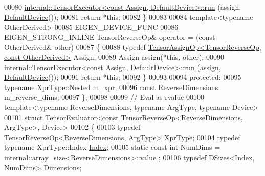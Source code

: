 \begin{DoxyCode}
00080       \hyperlink{class_eigen_1_1internal_1_1_tensor_executor}{internal::TensorExecutor<const Assign, DefaultDevice>::run}
      (assign, \hyperlink{struct_eigen_1_1_default_device}{DefaultDevice}());
00081       \textcolor{keywordflow}{return} *\textcolor{keyword}{this};
00082     \}
00083 
00084     \textcolor{keyword}{template}<\textcolor{keyword}{typename} OtherDerived>
00085     EIGEN\_DEVICE\_FUNC
00086     EIGEN\_STRONG\_INLINE TensorReverseOp& operator = (\textcolor{keyword}{const} OtherDerived& other)
00087     \{
00088       \textcolor{keyword}{typedef} \hyperlink{class_eigen_1_1_tensor_assign_op}{TensorAssignOp<TensorReverseOp, const OtherDerived>}
       Assign;
00089       Assign assign(*\textcolor{keyword}{this}, other);
00090       \hyperlink{class_eigen_1_1internal_1_1_tensor_executor}{internal::TensorExecutor<const Assign, DefaultDevice>::run}
      (assign, \hyperlink{struct_eigen_1_1_default_device}{DefaultDevice}());
00091       \textcolor{keywordflow}{return} *\textcolor{keyword}{this};
00092     \}
00093 
00094   \textcolor{keyword}{protected}:
00095     \textcolor{keyword}{typename} XprType::Nested m\_xpr;
00096     \textcolor{keyword}{const} ReverseDimensions m\_reverse\_dims;
00097 \};
00098 
00099 \textcolor{comment}{// Eval as rvalue}
00100 \textcolor{keyword}{template}<\textcolor{keyword}{typename} ReverseDimensions, \textcolor{keyword}{typename} ArgType, \textcolor{keyword}{typename} Device>
\hyperlink{struct_eigen_1_1_tensor_evaluator_3_01const_01_tensor_reverse_op_3_01_reverse_dimensions_00_01_arg_type_01_4_00_01_device_01_4}{00101} \textcolor{keyword}{struct }\hyperlink{struct_eigen_1_1_tensor_evaluator}{TensorEvaluator}<const \hyperlink{class_eigen_1_1_tensor_reverse_op}{TensorReverseOp}<ReverseDimensions, ArgType>, 
      Device>
00102 \{
00103   \textcolor{keyword}{typedef} \hyperlink{class_eigen_1_1_tensor_reverse_op}{TensorReverseOp<ReverseDimensions, ArgType>} 
      \hyperlink{class_eigen_1_1_tensor_reverse_op}{XprType};
00104   \textcolor{keyword}{typedef} \textcolor{keyword}{typename} XprType::Index \hyperlink{namespace_eigen_a62e77e0933482dafde8fe197d9a2cfde}{Index};
00105   \textcolor{keyword}{static} \textcolor{keyword}{const} \textcolor{keywordtype}{int} NumDims = \hyperlink{struct_eigen_1_1internal_1_1array__size}{internal::array\_size<ReverseDimensions>::value}
      ;
00106   \textcolor{keyword}{typedef} \hyperlink{struct_eigen_1_1_d_sizes}{DSizes<Index, NumDims>} \hyperlink{struct_eigen_1_1_d_sizes}{Dimensions};

\end{DoxyCode}
